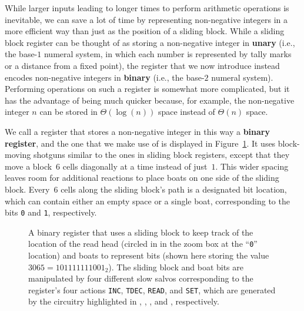 While larger inputs leading to longer times to perform arithmetic operations is inevitable, we can save a lot of time by representing non-negative integers in a more efficient way than just as the position of a sliding block. While a sliding block register can be thought of as storing a non-negative integer in \textbf{unary} (i.e., the base-$1$ numeral system, in which each number is represented by tally marks or a distance from a fixed point), the register that we now introduce instead encodes non-negative integers in \textbf{binary} (i.e., the base-$2$ numeral system). Performing operations on such a register is somewhat more complicated, but it has the advantage of being much quicker because, for example, the non-negative integer $n$ can be stored in $\Theta(\log(n))$ space instead of $\Theta(n)$ space.%

We call a register that stores a non-negative integer in this way a \textbf{binary register}, and the one that we make use of is displayed in Figure~\ref{fig:binary_register}. It uses block-moving shotguns similar to the ones in sliding block registers, except that they move a block~$6$ cells diagonally at a time instead of just~$1$. This wider spacing leaves room for additional reactions to place boats on one side of the sliding block. Every~$6$ cells along the sliding block's path is a designated bit location, which can contain either an empty space or a single boat, corresponding to the bits \texttt{0} and \texttt{1}, respectively.

\begin{figure}[!htb]
	\centering
	\caption{A binary register that uses a sliding block to keep track of the location of the read head (circled in  in the zoom box at the ``\texttt{0}'' location) and boats to represent bits (shown here storing the value $3065 = 101111111001_2$). The sliding block and boat bits are manipulated by four different slow salvos corresponding to the register's four actions \texttt{INC}, \texttt{TDEC}, \texttt{READ}, and \texttt{SET}, which are generated by the circuitry highlighted in , , , and , respectively.}\label{fig:binary_register}
\end{figure}

